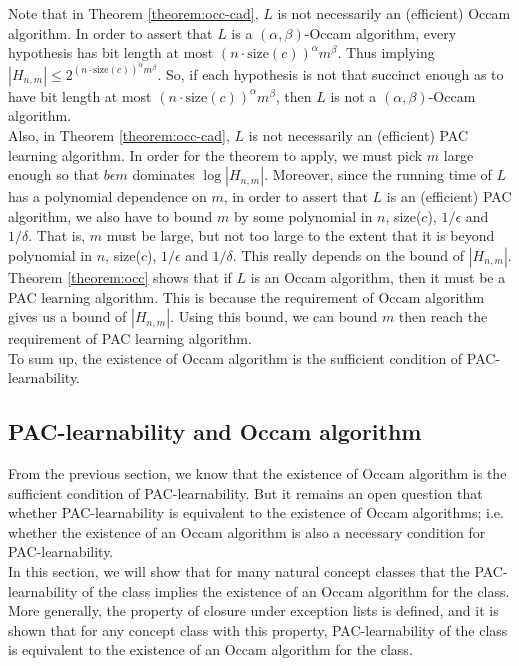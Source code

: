 \documentclass[12pt]{article}
\begin{document}
Note that in Theorem \ref{theorem:occ-cad}, $L$ is not necessarily an (efficient) Occam algorithm. In order to assert that $L$ is a $(\alpha, \beta)$-Occam algorithm, every hypothesis has bit length at most $(n \cdot \text {size}(c))^{\alpha}m^{\beta}$. Thus implying $|H_{n,m}| \le 2^{(n \cdot \text {size}(c))^{\alpha}m^{\beta}}$. So, if each hypothesis is not that succinct enough as to have bit length at most $(n \cdot \text {size}(c))^{\alpha}m^{\beta}$, then $L$ is not a $(\alpha, \beta)$-Occam algorithm. \\

Also, in Theorem \ref{theorem:occ-cad}, $L$ is not necessarily an (efficient) PAC learning algorithm. In order for the theorem to apply, we must pick $m$ large enough so that $b \epsilon m$ dominates $\log {|H_{n,m}|}$. Moreover, since the running time of $L$ has a polynomial dependence on $m$, in order to assert that $L$ is an (efficient) PAC algorithm, we also have to bound $m$ by some polynomial in $n$, size($c$), $1 / \epsilon$ and $1 / \delta$. That is, $m$ must be large, but not too large to the extent that it is beyond polynomial in $n$, size($c$), $1 / \epsilon$ and $1 / \delta$. This really depends on the bound of $|H_{n,m}|$. \\

Theorem \ref{theorem:occ} shows that if $L$ is an Occam algorithm, then it must be a PAC learning algorithm. This is because the requirement of Occam algorithm gives us a bound of $|H_{n,m}|$. Using this bound, we can bound $m$ then reach the requirement of PAC learning algorithm. \\

To sum up, the existence of Occam algorithm is the sufficient condition of PAC-learnability.

\subsection{PAC-learnability and Occam algorithm}

From the previous section, we know that the existence of Occam algorithm is the sufficient condition of PAC-learnability. But it remains an open question that whether PAC-learnability is equivalent to the existence of Occam algorithms; i.e. whether the existence of an Occam algorithm is also a necessary condition for PAC-learnability. \\

In this section, we will show that for many natural concept classes that the PAC-learnability of the class implies the existence of an Occam algorithm for the class. More generally, the property of closure under exception lists is defined, and it is shown that for any concept class with this property, PAC-learnability of the class is equivalent to the existence of an Occam algorithm for the class.
\end{document}
